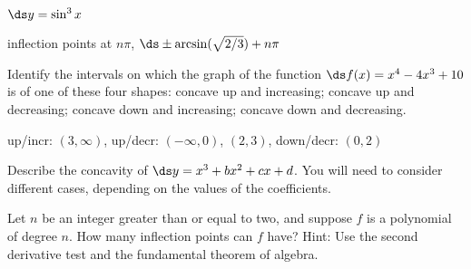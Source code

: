 \begin{enumialphparenastyle}
\begin{ex}
 $\ds y = \sin^3 x$
\begin{sol}
 inflection points at $n\pi$, $\ds \pm\arcsin(\sqrt{2/3})+n\pi$
\end{sol}
\end{ex}

\begin{ex}
 Identify the intervals on which the graph of the function
$\ds f(x) = x^4-4x^3 +10$ is of one of these four
shapes: concave up and increasing; concave up and decreasing; concave
down and increasing; concave down and decreasing.
\begin{sol}
 up/incr: $(3,\infty)$, up/decr: $(-\infty,0)$, $(2,3)$,
down/decr: $(0,2)$
\end{sol}
\end{ex}

\begin{ex}
 Describe the concavity of $\ds y =  x^3 + bx^2 + cx + d$.
You will need to consider different cases, depending on the values of
the coefficients.
\end{ex}

\begin{ex}
 Let $n$ be an integer greater than or equal to
two, and suppose $f$ is a polynomial of degree $n$. How many inflection points
can $f$ have?  Hint: Use the second derivative test and the
fundamental theorem of algebra.
\end{ex}

\end{enumialphparenastyle}